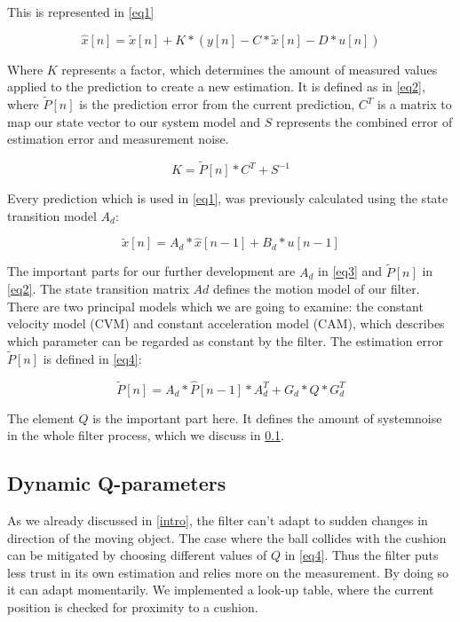 \documentclass[notitlepage, a4paper, 11pt]{scrartcl}
\begin{document}
\begin{multicols}{2}
This is represented in \cref{eq1}

\begin{equation} 
    \label{eq1}
    \hat{x}[n]=\tilde{x}[n]+K*(y[n]-C*\tilde{x}[n]-D*u[n])
\end{equation}

Where $K$ represents a factor, which determines the amount of measured values applied to the prediction to create a new estimation. It is defined as in \cref{eq2}, 
where $\tilde{P}[n]$ is the prediction error from the current prediction, $C^T$ is a matrix to map our state vector to our system model and $S$ represents the combined error of estimation error and measurement noise.

\begin{equation} 
    \label{eq2}
    K=\tilde{P}[n]*C^T+S^{-1}
\end{equation}

Every prediction which is used in \cref{eq1}, was previously calculated using the state transition model $A_d$:

\begin{equation} 
    \label{eq3}
    \tilde{x}[n]=A_d*\hat{x}[n-1]+B_d*u[n-1]
\end{equation}

The important parts for our further development are $A_d$ in \cref{eq3} and $\tilde{P}[n]$ in \cref{eq2}. The state transition matrix $Ad$ defines the motion model of our filter.
There are two principal models which we are going to examine: the constant velocity model (CVM) and constant acceleration model (CAM), which describes which parameter can be regarded as constant by the filter.
The estimation error $\tilde{P}[n]$ is defined in \cref{eq4}:

\begin{equation} 
    \label{eq4}
    \tilde{P}[n]=A_d*\hat{P}[n-1]*A_d^T+G_d*Q*G_d^T
\end{equation}

The element $Q$ is the important part here. It defines the amount of systemnoise in the whole filter process, which we discuss in \cref{dynamic-q}.

\subsection{Dynamic Q-parameters} \label{dynamic-q}

As we already discussed in \cref{intro}, the filter can't adapt to sudden changes in direction of the moving object. 
The case where the ball collides with the cushion can be mitigated by choosing different values of $Q$ in \cref{eq4}.
Thus the filter puts less trust in its own estimation and relies more on the measurement. By doing so it can adapt momentarily.
We implemented a look-up table, where the current position is checked for proximity to a cushion.


\end{multicols}
\end{document}
